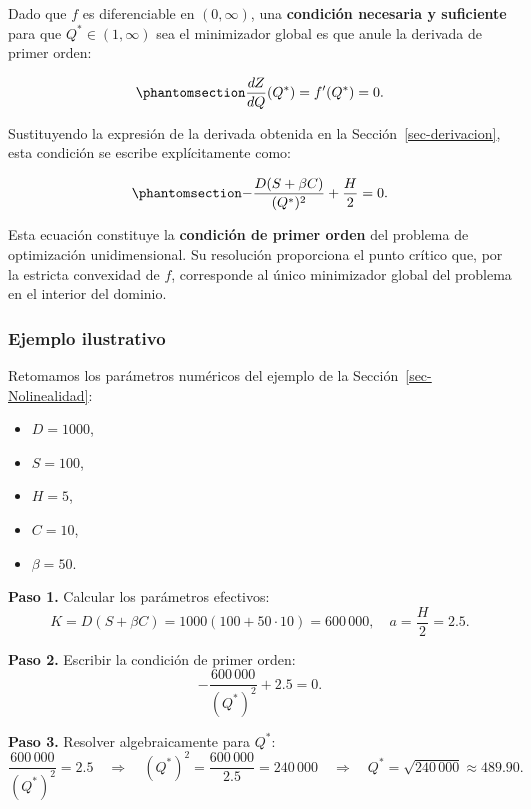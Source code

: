 \documentclass[
  spanish,
  us-letterpaper,
]{scrreprt}
\providecommand{\tightlist}{%
  \setlength{\itemsep}{0pt}\setlength{\parskip}{0pt}}
\numberwithin{equation}{section}
\begin{document}
Dado que \(f\) es diferenciable en \((0, \infty)\), una
\textbf{condición necesaria y suficiente} para que
\(Q^* \in (1, \infty)\) sea el minimizador global es que anule la
derivada de primer orden:

\begin{equation}\phantomsection\label{eq-cond_primer_orden_26}{
\frac{dZ}{dQ}(Q^*) = f'(Q^*) = 0.
}\end{equation}

Sustituyendo la expresión de la derivada obtenida en la
Sección~\ref{sec-derivacion}, esta condición se escribe explícitamente
como:

\begin{equation}\phantomsection\label{eq-ecuacion_criticidad_26}{
-\frac{D(S + \beta C)}{(Q^*)^2} + \frac{H}{2} = 0.
}\end{equation}

Esta ecuación constituye la \textbf{condición de primer orden} del
problema de optimización unidimensional. Su resolución proporciona el
punto crítico que, por la estricta convexidad de \(f\), corresponde al
único minimizador global del problema en el interior del dominio.

\subsubsection{Ejemplo ilustrativo}\label{ejemplo-ilustrativo-5}

Retomamos los parámetros numéricos del ejemplo de la
Sección~\ref{sec-Nolinealidad}:

\begin{itemize}
\tightlist
\item
  \(D = 1000\),
\item
  \(S = 100\),
\item
  \(H = 5\),
\item
  \(C = 10\),
\item
  \(\beta = 50\).
\end{itemize}

\textbf{Paso 1.} Calcular los parámetros efectivos: \[
K = D(S + \beta C) = 1000(100 + 50 \cdot 10) = 600\,000, \quad
a = \frac{H}{2} = 2.5.
\]

\textbf{Paso 2.} Escribir la condición de primer orden: \[
-\frac{600\,000}{(Q^*)^2} + 2.5 = 0.
\]

\textbf{Paso 3.} Resolver algebraicamente para \(Q^*\): \[
\frac{600\,000}{(Q^*)^2} = 2.5
\quad\Longrightarrow\quad
(Q^*)^2 = \frac{600\,000}{2.5} = 240\,000
\quad\Longrightarrow\quad
Q^* = \sqrt{240\,000} \approx 489.90.
\]
\end{document}
